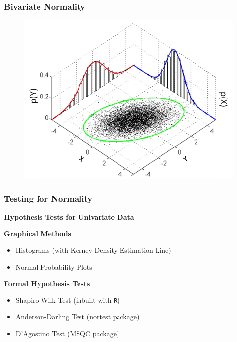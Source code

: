 \documentclass{beamer}
\begin{document}
\begin{frame}[fragile]
\frametitle{Bivariate Normality}

\begin{figure}[h!]
\centering
\includegraphics[width=0.95\linewidth]{./images/793px-MultivariateNormal}
\end{figure}
	
\end{frame}


\begin{frame}[fragile]
\frametitle{Testing for Normality}
	{
	\noindent\textbf{Hypothesis Tests for Univariate Data}
	
	\bigskip		\large
		\textbf{Graphical Methods}
		\begin{itemize}
			\item Histograms (with Kerney Density Estimation Line)
			\item Normal Probability Plots
		\end{itemize}
		\bigskip		\large
		\textbf{Formal Hypothesis Tests}
			\begin{itemize}
				\item Shapiro-Wilk Test (inbuilt with \texttt{R})
				\item Anderson-Darling Test (nortest package)
				\item D'Agostino Test (MSQC package)
			\end{itemize}
	}
\end{frame}
\end{document}
